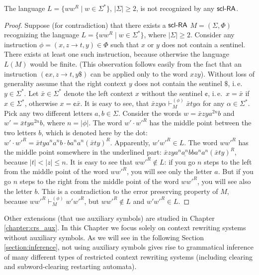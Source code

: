 \begin{theorem}[\cite{C13}]
The language $L = \{ w w^R \mid w \in \Sigma^* \}$, $|\Sigma| \ge 2$, is not recognized by any $\textup{\sf scl-RA}$.
\end{theorem}

\begin{proof}
Suppose (for contradiction) that there exists a $\textup{\sf scl-RA}$ $M = (\Sigma, \Phi)$  recognizing the language $L = \{ w w^R \mid w \in \Sigma^* \}$, where $|\Sigma| \ge 2$. Consider any instruction $\phi = (x, z \to t, y) \in \Phi$ such that $x$ or $y$ does not contain a sentinel. There exists at least one such instruction, because otherwise the language $L(M)$ would be finite. (This observation follows easily from the fact that an instruction  $(\cent x, z \to t, y\$)$ can be applied only to the word $xzy$). Without loss of generality assume that the right context $y$ does not contain the sentinel $\$$, i.\,e.\, $y \in \Sigma^*$. Let $\bar{x} \in \Sigma^*$ denote the left context $x$ without the sentinel $\cent$, i.\,e.\, $x = \bar{x}$ if $x \in \Sigma^*$, otherwise $x = \cent \bar{x}$. It is easy to see, that $\bar{x} z y \alpha \vdash_M^{(\phi)} \bar{x} t y \alpha$ for any $\alpha \in \Sigma^*$. Pick any two different letters $a, b \in \Sigma$. Consider the words $w = \bar{x} z y a^{2n} b$ and $w' = \bar{x} t y a^{2n} b$, where $n = |\phi|$. The word $w' \cdot w'^R$ has the middle point between the two letters $b$, which is denoted here by the dot: $w' \cdot w'^R = \bar{x} t y a^n a^n b \cdot b a^n a^n (\bar{x} t y)^R$. Apparently, $w' w'^R \in L$. The word $w w'^R$ has the middle point somewhere in the underlined part: $\bar{x} z y a^n \underline{a^n} b b a^n a^n (\bar{x} t y)^R$, because $|t| < |z| \le n$. It is easy to see that $w w'^R \notin L$: if you go $n$ steps to the left from the middle point of the word $w w'^R$, you will see only the letter $a$. But if you go $n$ steps to the right from the middle point of the word $w w'^R$, you will see also the letter $b$. This is a contradiction to the error preserving property of $M$, because $w w'^R \vdash_M^{(\phi)} w' w'^R$, but $w w'^R \notin L$ and $w' w'^R \in L$.
\end{proof}

Other extensions (that use auxiliary symbols) are studied in Chapter \ref{chapter:crs_aux}. In this Chapter we focus solely on context rewriting systems without auxiliary symbols. As we will see in the following Section \ref{section:inference}, not using auxiliary symbols gives rise to grammatical inference of many different types of restricted context rewriting systems (including clearing and subword-clearing restarting automata).

